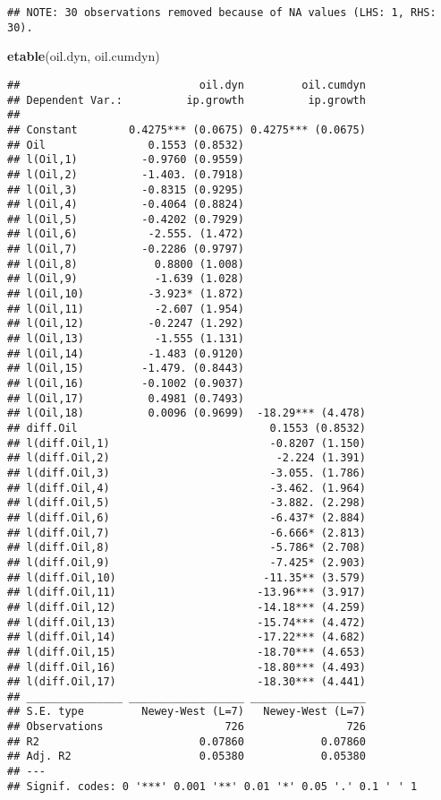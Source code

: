 \documentclass[
]{article}
\newenvironment{Shaded}{\begin{snugshade}}{\end{snugshade}}
\newcommand{\FunctionTok}[1]{\textcolor[rgb]{0.13,0.29,0.53}{\textbf{#1}}}
\newcommand{\NormalTok}[1]{#1}
\begin{document}
\begin{verbatim}
## NOTE: 30 observations removed because of NA values (LHS: 1, RHS: 30).
\end{verbatim}

\begin{Shaded}
\begin{Highlighting}[]
\FunctionTok{etable}\NormalTok{(oil.dyn, oil.cumdyn)}
\end{Highlighting}
\end{Shaded}

\begin{verbatim}
##                            oil.dyn         oil.cumdyn
## Dependent Var.:          ip.growth          ip.growth
##                                                      
## Constant        0.4275*** (0.0675) 0.4275*** (0.0675)
## Oil                0.1553 (0.8532)                   
## l(Oil,1)          -0.9760 (0.9559)                   
## l(Oil,2)          -1.403. (0.7918)                   
## l(Oil,3)          -0.8315 (0.9295)                   
## l(Oil,4)          -0.4064 (0.8824)                   
## l(Oil,5)          -0.4202 (0.7929)                   
## l(Oil,6)           -2.555. (1.472)                   
## l(Oil,7)          -0.2286 (0.9797)                   
## l(Oil,8)            0.8800 (1.008)                   
## l(Oil,9)            -1.639 (1.028)                   
## l(Oil,10)          -3.923* (1.872)                   
## l(Oil,11)           -2.607 (1.954)                   
## l(Oil,12)          -0.2247 (1.292)                   
## l(Oil,13)           -1.555 (1.131)                   
## l(Oil,14)          -1.483 (0.9120)                   
## l(Oil,15)         -1.479. (0.8443)                   
## l(Oil,16)         -0.1002 (0.9037)                   
## l(Oil,17)          0.4981 (0.7493)                   
## l(Oil,18)          0.0096 (0.9699)  -18.29*** (4.478)
## diff.Oil                              0.1553 (0.8532)
## l(diff.Oil,1)                         -0.8207 (1.150)
## l(diff.Oil,2)                          -2.224 (1.391)
## l(diff.Oil,3)                         -3.055. (1.786)
## l(diff.Oil,4)                         -3.462. (1.964)
## l(diff.Oil,5)                         -3.882. (2.298)
## l(diff.Oil,6)                         -6.437* (2.884)
## l(diff.Oil,7)                         -6.666* (2.813)
## l(diff.Oil,8)                         -5.786* (2.708)
## l(diff.Oil,9)                         -7.425* (2.903)
## l(diff.Oil,10)                       -11.35** (3.579)
## l(diff.Oil,11)                      -13.96*** (3.917)
## l(diff.Oil,12)                      -14.18*** (4.259)
## l(diff.Oil,13)                      -15.74*** (4.472)
## l(diff.Oil,14)                      -17.22*** (4.682)
## l(diff.Oil,15)                      -18.70*** (4.653)
## l(diff.Oil,16)                      -18.80*** (4.493)
## l(diff.Oil,17)                      -18.30*** (4.441)
## _______________ __________________ __________________
## S.E. type         Newey-West (L=7)   Newey-West (L=7)
## Observations                   726                726
## R2                         0.07860            0.07860
## Adj. R2                    0.05380            0.05380
## ---
## Signif. codes: 0 '***' 0.001 '**' 0.01 '*' 0.05 '.' 0.1 ' ' 1
\end{verbatim}
\end{document}
